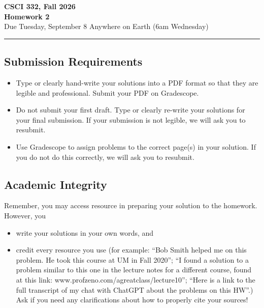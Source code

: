 \documentclass[11pt]{article}
\begin{document}
\begin{center}
\Large\textbf{CSCI 332, Fall 2026}%
\\
\LARGE\textbf{Homework 2}%
\\[0.5ex]
\large Due Tuesday, September 8 Anywhere on Earth (6am Wednesday)
\end{center}

\bigskip
\hrule
\bigskip

\subsection*{Submission Requirements}
\begin{itemize}
    \item Type or clearly hand-write your solutions into a PDF format so that they are legible and professional. Submit your PDF on Gradescope. 
    \item Do not submit your first draft. Type or clearly re-write your solutions for your final submission. If your submission is not legible, we will ask you to resubmit.
    \item Use Gradescope to assign problems to the correct page(s) in your solution. If you do not do this correctly, we will ask you to resubmit.
\end{itemize}

\subsection*{Academic Integrity}

Remember, you may access  resource in preparing your solution to the homework. However, you 
\begin{itemize}
    \item write your solutions in your own words, and
    \item credit every resource you use (for example: ``Bob Smith helped me on
    this problem. He took this course at UM in Fall 2020''; ``I found a solution
    to a problem similar to this one in the lecture notes for a different
    course, found at this link: www.profzeno.com/agreatclass/lecture10''; ``Here is a link to the full transcript of my chat with ChatGPT about the problems on this HW''.)
    Ask if you need any clarifications about how to properly cite your sources!
\end{itemize}




\newpage
\end{document}

